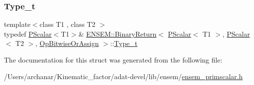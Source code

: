 \mbox{\label{structENSEM_1_1BinaryReturn_3_01PScalar_3_01T1_01_4_00_01PScalar_3_01T2_01_4_00_01OpBitwiseOrAssign_01_4_ab7df9b27d57d2e8f2e5ba5d5354709bd}} 
\subsubsection{\texorpdfstring{Type\_t}{Type\_t}\hspace{0.1cm}{\footnotesize\ttfamily [3/3]}}
{\footnotesize\ttfamily template$<$class T1 , class T2 $>$ \\
typedef \mbox{\hyperlink{classENSEM_1_1PScalar}{P\+Scalar}}$<$T1$>$\& \mbox{\hyperlink{structENSEM_1_1BinaryReturn}{E\+N\+S\+E\+M\+::\+Binary\+Return}}$<$ \mbox{\hyperlink{classENSEM_1_1PScalar}{P\+Scalar}}$<$ T1 $>$, \mbox{\hyperlink{classENSEM_1_1PScalar}{P\+Scalar}}$<$ T2 $>$, \mbox{\hyperlink{structENSEM_1_1OpBitwiseOrAssign}{Op\+Bitwise\+Or\+Assign}} $>$\+::\mbox{\hyperlink{structENSEM_1_1BinaryReturn_3_01PScalar_3_01T1_01_4_00_01PScalar_3_01T2_01_4_00_01OpBitwiseOrAssign_01_4_ab7df9b27d57d2e8f2e5ba5d5354709bd}{Type\+\_\+t}}}



The documentation for this struct was generated from the following file\+:\begin{DoxyCompactItemize}
\item 
/\+Users/archanar/\+Kinematic\+\_\+factor/adat-\/devel/lib/ensem/\mbox{\hyperlink{adat-devel_2lib_2ensem_2ensem__primscalar_8h}{ensem\+\_\+primscalar.\+h}}\end{DoxyCompactItemize}
